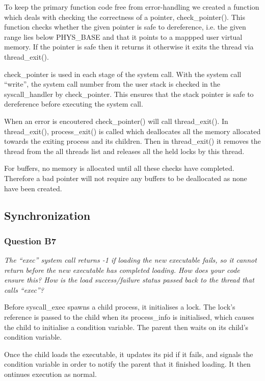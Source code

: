 To keep the primary function code free from error-handling we created a function which deals with checking the correctness of a pointer, check\_pointer(). This function checks whether the given pointer is safe to dereference, i.e. the given range lies below PHYS\_BASE and that it points to a mappped user virtual memory. If the pointer is safe then it returns it otherwise it exits the thread via thread\_exit().

check\_pointer is used in each stage of the system call. With the system call ``write'', the system call number from the user stack is checked in the syscall\_handler by check\_pointer. This ensures that the stack pointer is safe to dereference before executing the system call.


When an error is encoutered check\_pointer() will call thread\_exit(). In thread\_exit(), process\_exit() is called which deallocates all the memory allocated towards the exiting process and its children.
Then in thread\_exit() it removes the thread from the all threads list and releases all the held locks by this thread.

For buffers, no memory is allocated until all these checks have completed. Therefore a bad pointer will not require any buffers to be deallocated as none have been created.


\subsection{Synchronization}

\subsubsection*{Question B7} %
\textit{The ``exec'' system call returns -1 if loading the new executable fails, so it cannot return before the new executable has completed loading.  How does your code ensure this?  How is the load success/failure status passed back to the thread that calls ``exec''?}

Before syscall\_exec spawns a child process, it initialises a lock. The lock's reference is passed to the child when its process\_info is initialised, which causes the child to initialise a condition variable. The parent then waits on its child's condition variable.

Once the child loads the executable, it updates its pid if it fails, and signals the condition variable in order to notify the parent that it finished loading. It then ontinues execution as normal.

